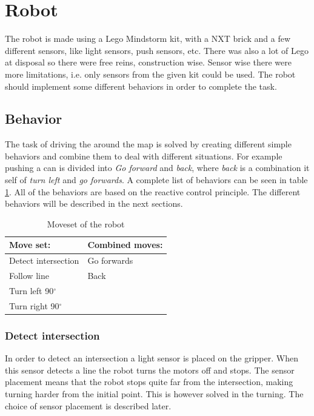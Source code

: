 \section{Robot} 

The robot is made using a Lego Mindstorm kit, with a NXT brick and a few different sensors, like light sensors, push sensors, etc. There was also a lot of Lego at disposal so there were free reins, construction wise. Sensor wise there were more limitations, i.e. only sensors from the given kit could be used. The robot should implement some different behaviors in order to complete the task.

\subsection{Behavior} \label{sec:behavior}
The task of driving the around the map is solved by creating different simple behaviors and combine them to deal with different situations. For example pushing a can is divided into \textit{Go forward} and \textit{back}, where \textit{back} is a combination it self of \textit{turn left} and \textit{go forwards}. A complete list of behaviors can be seen in table \ref{tab:movset}. All of the behaviors are based on the reactive control principle. The different behaviors will be described in the next sections.

\begin{table}[H]
\centering
 \begin{tabular}{|l|l|}
  \hline
  Move set: &  Combined moves: \\
  \hline
   Detect intersection & Go forwards\\
   Follow line & Back\\
   Turn left 90$^{\circ}$  &\\
   Turn right 90$^{\circ}$ & \\
   \hline
 \end{tabular}
\caption{Moveset of the robot}
\label{tab:movset}
\end{table}

\subsubsection{Detect intersection}
In order to detect an intersection a light sensor is placed on the gripper. When this sensor detects a line the robot turns the motors off and stops. 
The sensor placement means that the robot stops quite far from the intersection, making turning harder from the initial point.
This is however solved in the turning.
The choice of sensor placement is described later.

